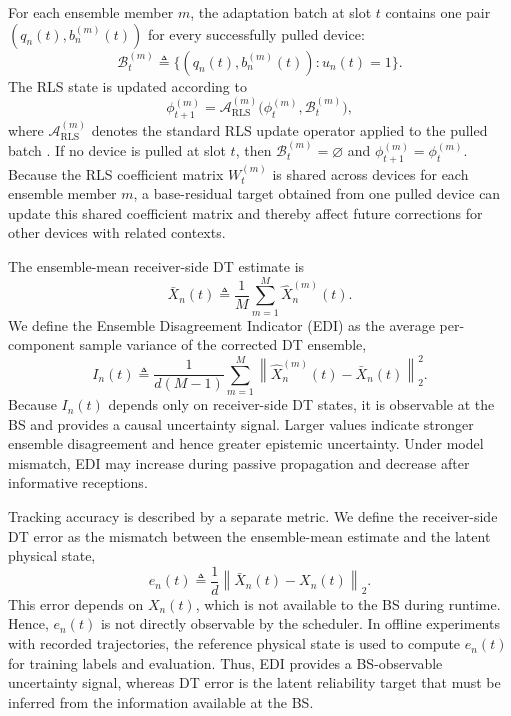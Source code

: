 \documentclass[conference]{IEEEtran}
\begin{document}
For each ensemble member \(m\), the adaptation batch at slot \(t\) contains
one pair \((q_n(t),b_n^{(m)}(t))\) for every successfully pulled device:
\vspace{-2.3mm}
\begin{equation}
\label{eq:adaptation_batch}
\mathcal B_t^{(m)}
\triangleq
\big\{(q_n(t),b_n^{(m)}(t)):u_n(t)=1\big\}.
\end{equation}
The RLS state is updated according to
\vspace{-0.4mm}
\begin{equation}
\label{eq:adaptation_update}
\phi_{t+1}^{(m)}
=
\mathcal A_{\mathrm{RLS}}^{(m)}
\big(\phi_t^{(m)},\mathcal B_t^{(m)}\big),
\end{equation}
where \(\mathcal A_{\mathrm{RLS}}^{(m)}\)  denotes the standard RLS update
operator applied to the pulled batch \cite{RLS}.
If no device is pulled at slot \(t\), then
\(\mathcal B_t^{(m)}=\varnothing\) and \(\phi_{t+1}^{(m)}=\phi_t^{(m)}\).
Because the RLS coefficient matrix \(W_t^{(m)}\) is shared across devices
for each ensemble member \(m\), a base-residual target obtained from one
pulled device can update this shared coefficient matrix and thereby affect
future corrections for other devices with related contexts.

The ensemble-mean receiver-side DT estimate is
\vspace{-1mm}
\begin{equation}
\label{eq:ensemble_mean}
\bar X_n(t)
\triangleq
\frac{1}{M}\sum_{m=1}^{M}\hat X_n^{(m)}(t).
\end{equation}
We define the Ensemble Disagreement Indicator (EDI) as the average per-component sample variance of the corrected DT ensemble,
\vspace{-1.6mm}
\begin{equation}
\label{eq:aoint_new}
I_n(t)
\triangleq
\frac{1}{d(M-1)}
\sum_{m=1}^{M}
\left\|
\hat X_n^{(m)}(t)-\bar X_n(t)
\right\|_2^2 .
\end{equation}
Because \(I_n(t)\) depends only on receiver-side DT states, it is
observable at the BS and provides a causal uncertainty signal. Larger values
indicate stronger ensemble disagreement and hence greater epistemic
uncertainty.  Under model mismatch, EDI may increase during passive propagation
and decrease after informative receptions.

Tracking accuracy is described by a separate metric. We define the
receiver-side DT error as the mismatch between the ensemble-mean estimate
and the latent physical state,
\vspace{-1.2mm}
\begin{equation}
\label{eq:dt_error_system}
e_n(t)
\triangleq
\frac{1}{d}
\left\|
\bar X_n(t)-X_n(t)
\right\|_2 .
\end{equation}
This error depends on \(X_n(t)\), which is not available to the BS during
runtime. Hence, \(e_n(t)\) is not directly observable by the scheduler. In
offline experiments with recorded trajectories, the reference physical state
is used to compute \(e_n(t)\) for training labels and evaluation. Thus,
EDI provides a BS-observable uncertainty signal, whereas DT error is the
latent reliability target that must be inferred from the information available at the BS.
\vspace{-1.10mm}
\end{document}
